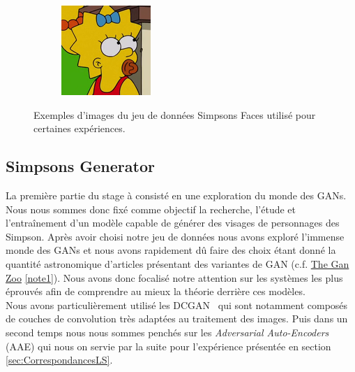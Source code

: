 \documentclass[11pt,francais]{article}
\begin{document}
\begin{figure}[!h]
\begin{subfigure}[b]{0.19\textwidth}
    \end{subfigure}
    \begin{subfigure}[b]{0.19\textwidth}
        \includegraphics[width=\textwidth]{Figures/Simpsons_Dataset/18.png}
    \end{subfigure}
    \caption{Exemples d'images du jeu de données Simpsons Faces utilisé pour certaines expériences.}
    \label{fig:fig1}
\end{figure}

\subsection{Simpsons Generator}
\label{sec:SimpsonsGenerator}
La première partie du stage à consisté en une exploration du monde des GANs. Nous nous sommes donc fixé comme objectif la recherche, l'étude et l'entraînement d'un modèle capable de générer des visages de personnages des Simpson.
Après avoir choisi notre jeu de données nous avons exploré l'immense monde des GANs et nous avons rapidement dû faire des choix étant donné la quantité astronomique d'articles présentant des variantes de GAN (c.f. \href{https://github.com/hindupuravinash/the-gan-zoo}{The Gan Zoo} \ref{note1}).
Nous avons donc focalisé notre attention sur les systèmes les plus éprouvés afin de comprendre au mieux la théorie derrière ces modèles.\\
Nous avons particulièrement utilisé les DCGAN~\cite{radford2015unsupervised} qui sont notamment composés de couches de convolution très adaptées au traitement des images. Puis dans un second temps nous nous sommes penchés sur les \textit{Adversarial Auto-Encoders} (AAE) qui nous on servie par la suite pour l'expérience présentée en section \ref{sec:CorrespondancesLS}.
\end{document}
